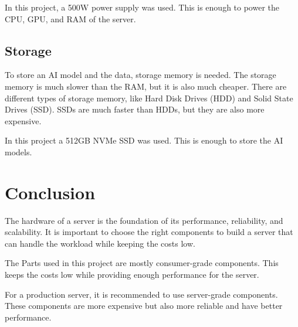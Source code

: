 In this project, a 500W power supply was used. This is enough to power the CPU, GPU, and RAM of the server.

\cite{PowerSupply}

\subsection{Storage}

To store an AI model and the data, storage memory is needed. The storage memory is much slower than the RAM, but it is also much cheaper. 
There are different types of storage memory, like Hard Disk Drives (HDD) and Solid State Drives (SSD). SSDs are much faster than HDDs, but they are also more expensive.

In this project a 512GB NVMe SSD was used. This is enough to store the AI models.

\cite{DataStorage}



\section{Conclusion}

The hardware of a server is the foundation of its performance, reliability, and scalability. It is important to choose the right components to build a server that can handle the workload while keeping the costs low.

The Parts used in this project are mostly consumer-grade components. This keeps the costs low while providing enough performance for the server.

For a production server, it is recommended to use server-grade components. These components are more expensive but also more reliable and have better performance.

